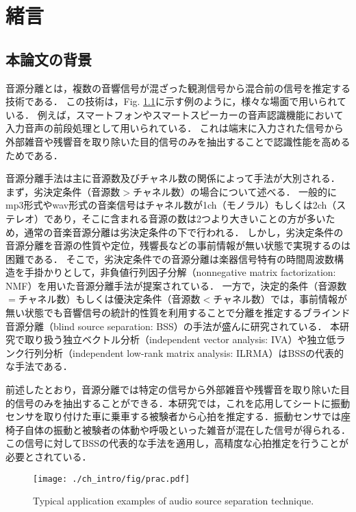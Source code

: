 \chapter{緒言}
\label{chap:intro}

\section{本論文の背景}
音源分離とは，複数の音響信号が混ざった観測信号から混合前の信号を推定する技術である．
この技術は，Fig. \ref{fig:prac}に示す例のように，様々な場面で用いられている．
例えば，スマートフォンやスマートスピーカーの音声認識機能において入力音声の前段処理として用いられている．
これは端末に入力された信号から外部雑音や残響音を取り除いた目的信号のみを抽出することで認識性能を高めるためである．

音源分離手法は主に音源数及びチャネル数の関係によって手法が大別される．
まず，劣決定条件（音源数$>$チャネル数）の場合について述べる．
一般的にmp3形式やwav形式の音楽信号はチャネル数が1ch（モノラル）もしくは2ch（ステレオ）であり，そこに含まれる音源の数は2つより大きいことの方が多いため，通常の音楽音源分離は劣決定条件の下で行われる．
しかし，劣決定条件の音源分離を音源の性質や定位，残響長などの事前情報が無い状態で実現するのは困難である．
そこで，劣決定条件での音源分離は楽器信号特有の時間周波数構造を手掛かりとして，非負値行列因子分解（nonnegative matrix factorization: NMF）\cite{NMF}を用いた音源分離手法\cite{singlechsep, supNMF, MNMF_oz}が提案されている．
一方で，決定的条件（音源数$=$チャネル数）もしくは優決定条件（音源数$<$チャネル数）では，事前情報が無い状態でも音響信号の統計的性質を利用することで分離を推定するブラインド音源分離（blind source separation: BSS）\cite{bss_review}の手法が盛んに研究されている．
本研究で取り扱う独立ベクトル分析（independent vector analysis: IVA）\cite{Kim2007_iva, auxIVA}や独立低ランク行列分析（independent low-rank matrix analysis: ILRMA）\cite{ILRMA, Kitamura2018_ilrma}はBSSの代表的な手法である．

前述したとおり，音源分離では特定の信号から外部雑音や残響音を取り除いた目的信号のみを抽出することができる．本研究では，これを応用してシートに振動センサを取り付けた車に乗車する被験者から心拍を推定する．振動センサでは座椅子自体の振動と被験者の体動や呼吸といった雑音が混在した信号が得られる．
この信号に対してBSSの代表的な手法を適用し，高精度な心拍推定を行うことが必要とされている．


\begin{figure}[!t]
\centering
\texttt{[image: ./ch\_intro/fig/prac.pdf]}
\caption{Typical application examples of audio source separation technique.}
\label{fig:prac}
\end{figure}


